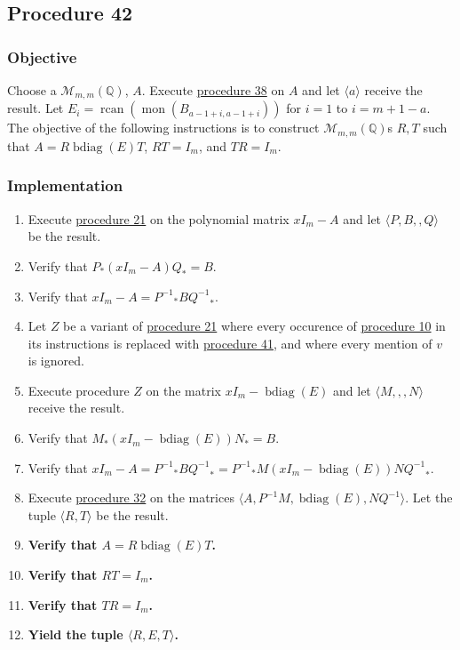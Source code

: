 \documentclass[twocolumn]{article}
\DeclareMathOperator{\bdiag}{bdiag}
\DeclareMathOperator{\rcan}{rcan}
\DeclareMathOperator{\mon}{mon}
\begin{document}
		\subsection{Procedure 42}\label{sec:procedure 42}
			\subsubsection{Objective}
				Choose a $\mathcal{M}_{m,m}(\mathbb{Q})$, $A$. Execute \hyperref[sec:procedure 38]{procedure 38} on $A$ and let $\langle a\rangle$ receive the result. Let $E_i=\rcan(\mon(B_{a-1+i,a-1+i}))$ for $i=1$ to $i=m+1-a$. The objective of the following instructions is to construct $\mathcal{M}_{m,m}(\mathbb{Q})$s $R,T$ such that $A=R\bdiag(E)T$, $RT=I_m$, and $TR=I_m$.
			\subsubsection{Implementation}
				\begin{enumerate}
					\item Execute \hyperref[sec:procedure 21]{procedure 21} on the polynomial matrix $xI_m-A$ and let $\langle P,B,,Q\rangle$ be the result.
					\item Verify that $P_*(xI_m-A)Q_*=B$.
					\item Verify that $xI_m-A={P^{-1}}_*B{Q^{-1}}_*$.
					\item Let $Z$ be a variant of \hyperref[sec:procedure 21]{procedure 21} where every occurence of \hyperref[sec:procedure 10]{procedure 10} in its instructions is replaced with \hyperref[sec:procedure 41]{procedure 41}, and where every mention of $v$ is ignored.
					\item Execute procedure $Z$ on the matrix $xI_m-\bdiag(E)$ and let $\langle M,,,N\rangle$ receive the result.
					\item Verify that $M_*(xI_m-\bdiag(E))N_*=B$.
					\item Verify that $xI_m-A={P^{-1}}_*B{Q^{-1}}_*={P^{-1}}_*M(xI_m-\bdiag(E))N{Q^{-1}}_*$.
					\item Execute \hyperref[sec:procedure 32]{procedure 32} on the matrices $\langle A,{P}^{-1}M,\bdiag(E),N{Q}^{-1}\rangle$. Let the tuple $\langle R,T\rangle$ be the result.
					\item \textbf{Verify that $A=R\bdiag(E)T$.}
					\item \textbf{Verify that $RT=I_m$.}
					\item \textbf{Verify that $TR=I_m$.}
					\item \textbf{Yield the tuple $\langle R,E,T\rangle$.}
				\end{enumerate}
\end{document}
